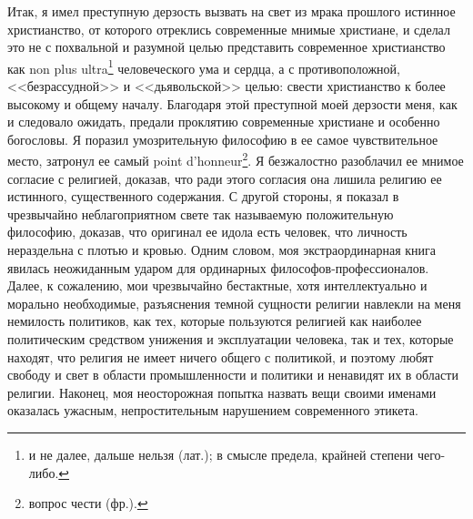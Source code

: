 \documentclass[12pt,oneside]{book}
\begin{document}
Итак, я имел преступную дерзость вызвать на свет из мрака прошлого истинное христианство, от которого отреклись современные мнимые христиане, и сделал это не с похвальной и разумной целью представить современное христианство как non plus ultra\footnote{и не далее, дальше нельзя (лат.); в смысле предела, крайней степени чего-либо.} человеческого ума и сердца, а с противоположной, <<безрассудной>> и <<дьявольской>> целью: свести христианство к более высокому и общему началу. Благодаря этой преступной моей дерзости меня, как и следовало ожидать, предали проклятию современные христиане и особенно богословы. Я поразил умозрительную философию в ее самое чувствительное место, затронул ее самый point d'honneur\footnote{вопрос чести (фр.).}. Я безжалостно разоблачил ее мнимое согласие с религией, доказав, что ради этого согласия она лишила религию ее истинного, существенного содержания. С другой стороны, я показал в чрезвычайно неблагоприятном свете так называемую положительную философию, доказав, что оригинал ее идола есть человек, что личность нераздельна с плотью и кровью. Одним словом, моя экстраординарная книга явилась неожиданным ударом для ординарных философов-профессионалов. Далее, к сожалению, мои чрезвычайно бестактные, хотя интеллектуально и морально необходимые, разъяснения темной сущности религии навлекли на меня немилость политиков, как тех, которые пользуются религией как наиболее политическим средством унижения и эксплуатации человека, так и тех, которые находят, что религия не имеет ничего общего с политикой, и поэтому любят свободу и свет в области промышленности и политики и ненавидят их в области религии. Наконец, моя неосторожная попытка назвать вещи своими именами оказалась ужасным, непростительным нарушением современного этикета.
\end{document}

